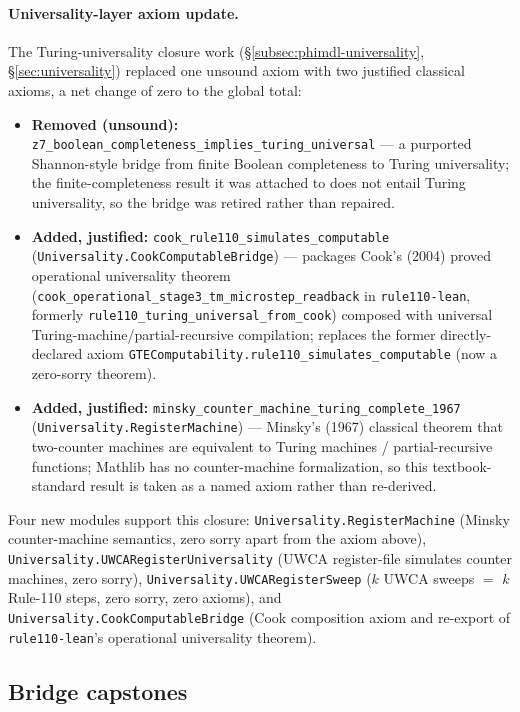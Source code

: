 \documentclass[11pt,a4paper]{article}
\theoremstyle{definition}
\begin{document}
\paragraph{Universality-layer axiom update.}
The Turing-universality closure work (\S\ref{subsec:phimdl-universality},
\S\ref{sec:universality}) replaced one unsound axiom with two justified classical
axioms, a net change of zero to the global total:
\begin{itemize}[nosep]
\item \textbf{Removed (unsound):} \lstinline|z7_boolean_completeness_implies_turing_universal|
  --- a purported Shannon-style bridge from finite Boolean completeness to Turing
  universality; the finite-completeness result it was attached to does not entail
  Turing universality, so the bridge was retired rather than repaired.
\item \textbf{Added, justified:} \lstinline|cook_rule110_simulates_computable|
  (\texttt{Universality.CookComputableBridge}) --- packages Cook's (2004) proved
  operational universality theorem (\lstinline|cook_operational_stage3_tm_microstep_readback|
  in \texttt{rule110-lean}, formerly \lstinline|rule110_turing_universal_from_cook|)
  composed with universal Turing-machine/partial-recursive
  compilation; replaces the former directly-declared axiom
  \lstinline|GTEComputability.rule110_simulates_computable| (now a zero-sorry theorem).
\item \textbf{Added, justified:} \lstinline|minsky_counter_machine_turing_complete_1967|
  (\texttt{Universality.RegisterMachine}) --- Minsky's (1967) classical theorem that
  two-counter machines are equivalent to Turing machines / partial-recursive functions;
  Mathlib has no counter-machine formalization, so this textbook-standard result is
  taken as a named axiom rather than re-derived.
\end{itemize}
Four new modules support this closure:
\texttt{Universality.RegisterMachine} (Minsky counter-machine semantics, zero sorry
apart from the axiom above), \texttt{Universality.UWCARegisterUniversality} (UWCA
register-file simulates counter machines, zero sorry),
\texttt{Universality.UWCARegisterSweep} ($k$ UWCA sweeps $=$ $k$ Rule-110 steps, zero
sorry, zero axioms), and \texttt{Universality.CookComputableBridge} (Cook composition
axiom and re-export of \texttt{rule110-lean}'s operational universality theorem).

\subsection{Bridge capstones}\label{subsec:audit-capstones}
\end{document}
